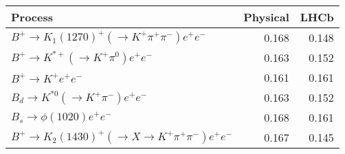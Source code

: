 \begin{tabular}{lrr}
\toprule
Process & Physical & LHCb \\
\midrule
$B^+\to K_1(1270)^+(\to K^+\pi^+\pi^-)e^+e^-$ & 0.168 & 0.148 \\
$B^+\to K^{*+}(\to K^+\pi^0)e^+e^-$ & 0.163 & 0.152 \\
$B^+\to K^+e^+e^-$ & 0.161 & 0.161 \\
$B_d\to K^{*0}(\to K^+\pi^-)e^+e^-$ & 0.163 & 0.152 \\
$B_s\to \phi(1020)e^+e^-$ & 0.168 & 0.161 \\
$B^+\to K_2(1430)^+(\to X \to K^+\pi^+\pi^-)e^+e^-$ & 0.167 & 0.145 \\
\bottomrule
\end{tabular}
